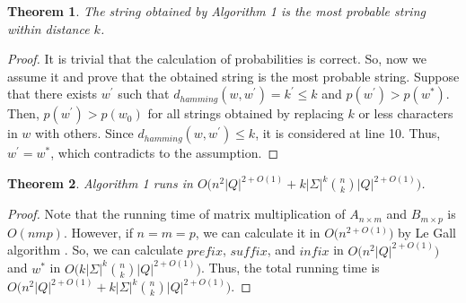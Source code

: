 \documentclass{article}
\theoremstyle{plain}
\newtheorem{theorem}{Theorem}
\theoremstyle{definition}
\theoremstyle{remark}
\begin{document}
\begin{theorem}
The string obtained by Algorithm 1 is the most probable string within distance $k$.
\end{theorem}
\begin{proof}
It is trivial that the calculation of probabilities is correct. So, now we assume it and prove that the obtained string is the most probable string. Suppose that there exists $w^{\prime}$ such that $d_{hamming}(w,w^{\prime})=k^{'}\leq k$ and $p(w^{\prime})>p(w^{*})$. Then, $p(w^{\prime})>p(w_{0})$ for all strings obtained by replacing $k$ or less characters in $w$ with others. Since $d_{hamming}(w,w^{\prime})\leq k$, it is considered at line 10. Thus, $w^{\prime}=w^{*}$, which contradicts to the assumption.
\end{proof}
\begin{theorem}
Algorithm 1 runs in $O\big( n^{2}{|Q|}^{2+O(1)}+k{|\Sigma|}^{k}{n\choose k}{|Q|}^{2+O(1)}\big)$.
\end{theorem}
\begin{proof}
Note that the running time of matrix multiplication of $A_{n\times m}$ and $B_{m\times p}$ is $O(nmp)$. However, if $n=m=p$, we can calculate it in $O\big(n^{2+O(1)}\big)$ by Le Gall algorithm \cite{le2014powers}. So, we can calculate $prefix$, $suffix$, and $infix$ in $O\big(n^{2}{|Q|}^{2+O(1)} \big)$ and $w^{*}$ in $O\big(k{|\Sigma|}^{k}{n\choose k}{|Q|}^{2+O(1)} \big)$. Thus, the total running time is $O\big( n^{2}{|Q|}^{2+O(1)}+k{|\Sigma|}^{k}{n\choose k}{|Q|}^{2+O(1)}\big)$.
\end{proof}

\end{document}
